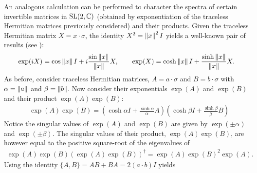 \documentclass[notitlepage]{article}
\begin{document}
An analogous calculation can be performed to character the spectra of certain invertible matrices in $\operatorname{SL}(2, \mathbb C)$ (obtained by exponentiation of the traceless Hermitian matrices previously considered) and their products.
Given the traceless Hermitian matrix $X = x \cdot \sigma$, the identity $X^2 = \left\lVert x\right\rVert^{2} I$ yields a well-known pair of results (see \cite{forrester2014golden}):
\begin{equation}
    \exp(iX) = \cos \left\lVert x\right\rVert I + i\frac{\sin \left\lVert x\right\rVert}{\left\lVert x\right\rVert} X, \qquad 
    \exp(X) = \cosh \left\lVert x\right\rVert I + \frac{\sinh \left\lVert x\right\rVert}{\left\lVert x\right\rVert} X.
\end{equation}
As before, consider traceless Hermitian matrices, $A = a \cdot \sigma$ and $B = b \cdot \sigma$ with $\alpha = \left\lVert a\right\rVert$ and $\beta = \left\lVert b\right\rVert$.
Now consider their exponentials $\exp(A)$ and $\exp(B)$ and their product $\exp(A)\exp(B)$:
\begin{align}
    &\exp(A)\exp(B) 
    = \left(\cosh \alpha I + \frac{\sinh \alpha}{\alpha} A\right)\left(\cosh \beta I + \frac{\sinh \beta}{\beta} B\right)
\end{align}
Notice the singular values of $\exp(A)$ and $\exp(B)$ are given by $\exp(\pm \alpha)$ and $\exp(\pm \beta)$.
The singular values of their product, $\exp(A)\exp(B)$, are however equal to the positive square-root of the eigenvalues of
\begin{align}
    \exp(A)\exp(B)(\exp(A)\exp(B))^{\dagger} = \exp(A)\exp(B)^2\exp(A).
\end{align}
Using the identity $\{A,B\} = AB+BA = 2 (a \cdot b) I$ yields
\end{document}
